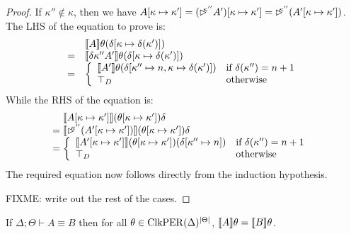 \begin{proof}
  If $\kappa'' \not\in \kappa$, then we have $A[\kappa \mapsto
  \kappa'] = (\mathord{\rhd\kern-0.4em^{\kappa''}} A')[\kappa \mapsto \kappa'] =
  \mathord{\rhd\kern-0.4em^{\kappa''}} (A'[\kappa \mapsto \kappa'])$. The LHS of the
  equation to prove is:
  \begin{displaymath}
    \begin{array}{cl}
      & \llbracket A \rrbracket\theta (\delta[\kappa \mapsto \delta(\kappa')]) \\
      =& \llbracket \delta{\kappa''}A' \rrbracket \theta (\delta[\kappa \mapsto \delta(\kappa')]) \\
      =&\left\{
        \begin{array}{ll}
          \llbracket A' \rrbracket\theta(\delta[\kappa'' \mapsto n, \kappa \mapsto \delta(\kappa')]) & \textrm{if }\delta(\kappa'') = n + 1 \\
          \top_D & \textrm{otherwise}
        \end{array}
      \right.
    \end{array}
  \end{displaymath}
  While the RHS of the equation is:
  \begin{displaymath}
    \begin{array}{@{}c@{\hspace{0.3em}}l}
      & \sem{A[\kappa \mapsto \kappa']}(\theta[\kappa\mapsto\kappa'])\delta \\
      =&\sem{\delay{\kappa''}(A'[\kappa\mapsto\kappa'])}(\theta[\kappa\mapsto\kappa'])\delta \\
      =&\left\{
        \begin{array}{ll}
          \sem{A'[\kappa\mapsto\kappa']}(\theta[\kappa\mapsto\kappa'])(\delta[\kappa'' \mapsto n]) & \textrm{if }\delta(\kappa'') = n + 1\\
          \top_D & \textrm{otherwise}
        \end{array}
      \right.
    \end{array}
  \end{displaymath}
  The required equation now follows directly from the induction
  hypothesis.

  FIXME: write out the rest of the cases.
\end{proof}

\begin{lemma}\label{lem:type-equality}
  If $\Delta; \Theta \vdash A \equiv B$ then for all $\theta \in
  \mathrm{ClkPER}(\Delta)^{|\Theta|}$, $\llbracket A \rrbracket\theta = \llbracket B \rrbracket\theta$.
\end{lemma}

